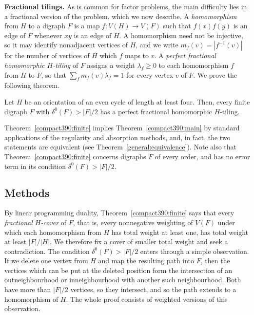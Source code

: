 \smallskip

\noindent\textbf{Fractional tilings.}
As is common for factor problems, the main difficulty lies in a fractional version of the problem, which we now describe.
A \emph{homomorphism} from $H$ to a digraph $F$ is a map $f:V(H)\to V(F)$ such that $f(x)f(y)$ is an edge of $F$ whenever $xy$ is an edge of $H$. A homomorphism need not be injective, so it may identify nonadjacent vertices of $H$, and we write $m_f(v)=|f^{-1}(v)|$ for the number of vertices of $H$ which $f$ maps to $v$.
A \emph{perfect fractional homomorphic $H$-tiling} of $F$ assigns a weight $\lambda_f\geq 0$ to each homomorphism $f$ from $H$ to $F$, so that $\sum_f m_f(v)\lambda_f=1$ for every vertex $v$ of $F$.
We prove the following theorem.

\begin{theorem}\label{compact390:finite}
Let $H$ be an orientation of an even cycle of length at least four. Then, every finite digraph $F$ with $\delta^0(F)>|F|/2$ has a perfect
fractional homomorphic $H$-tiling.
\end{theorem}

Theorem~\ref{compact390:finite} implies Theorem~\ref{compact390:main} by standard applications of the regularity and absorption methods, and, in fact, the two statements are equivalent (see Theorem~\ref{general:equivalence}).
Note also that Theorem~\ref{compact390:finite} concerns digraphs $F$ of every order, and has no error term in its condition $\delta^0(F)>|F|/2$.

\subsection{Methods}\label{sec:methods}
By linear programming duality, Theorem~\ref{compact390:finite} says that every \emph{fractional $H$-cover} of $F$, that is, every nonnegative weighting of $V(F)$ under which each homomorphism from $H$ has total weight at least one, has total weight at least $|F|/|H|$.
We therefore fix a cover of smaller total weight and seek a contradiction.
The condition $\delta^0(F)>|F|/2$ enters through a simple observation. If we delete one vertex from $H$ and map the resulting path into $F$, then the vertices which can be put at the deleted position form the intersection of an outneighbourhood or inneighbourhood with another such neighbourhood. Both have more than $|F|/2$ vertices, so they intersect, and so the path extends to a homomorphism of $H$. The whole proof consists of weighted versions of this observation.

